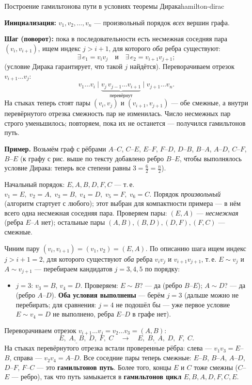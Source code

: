 \begin{algo}{Построение гамильтонова пути в условиях теоремы Дирака}{hamilton-dirac}

\textbf{Инициализация:} $v_1, v_2, \ldots, v_n$ --- произвольный порядок
\emph{всех} вершин графа.

\textbf{Шаг (поворот):} пока в последовательности есть несмежная соседняя
пара $(v_i, v_{i+1})$, ищем индекс $j > i + 1$, для которого
\emph{оба} ребра существуют:
\[
  \exists\, e_1 = v_i v_j \quad\text{и}\quad \exists\, e_2 = v_{i+1} v_{j+1};
\]
(условие Дирака гарантирует, что такой $j$ найдётся). Переворачиваем
отрезок $v_{i+1} \ldots v_j$:
\[
  v_1 \ldots v_i \;\bigl|\; \underbrace{v_j \, v_{j-1} \ldots v_{i+1}}_{\text{перевёрнут}} \;\bigl|\; v_{j+1} \ldots v_n.
\]
На стыках теперь стоят пары $(v_i, v_j)$ и $(v_{i+1}, v_{j+1})$ ---
обе смежные, а внутри перевёрнутого отрезка смежность пар не изменилась.
Число несмежных пар строго уменьшилось; повторяем, пока их не останется
--- получился гамильтонов путь.

\medskip
\noindent\textbf{Пример.} Возьмём граф с рёбрами
$A$--$C$, $C$--$E$, $E$--$F$, $F$--$D$, $D$--$B$, $B$--$A$, $A$--$D$,
$C$--$F$, $B$--$E$ (к графу с рис. выше по тексту добавлено ребро
$B$--$E$, чтобы выполнялось условие Дирака: теперь все степени равны
$3 = \frac{6}{2} = \frac{n}{2}$).


Начальный порядок: $E, A, B, D, F, C$ --- т.\,е.
$v_1 = E,\; v_2 = A,\; v_3 = B,\; v_4 = D,\; v_5 = F,\; v_6 = C$.
Порядок \emph{произвольный} (алгоритм стартует с любого); этот выбран
для компактности примера --- в нём всего одна несмежная соседняя пара.
Проверяем пары: $(E, A)$ --- \emph{несмежная} (ребра $E$--$A$ нет);
остальные пары $(A,B), (B,D), (D,F), (F,C)$ --- смежные.

Чиним пару $(v_i, v_{i+1}) = (v_1, v_2) = (E, A)$. По описанию шага ищем
индекс $j > i + 1 = 2$, для которого существуют \emph{оба} ребра
$v_i v_j$ и $v_{i+1} v_{j+1}$, т.\,е. $E \sim v_j$ и $A \sim v_{j+1}$
--- перебираем кандидатов $j = 3, 4, 5$ по порядку:
\begin{itemize}
  \item $j = 3$: $v_3 = B$, $v_4 = D$. Проверяем: $E \sim B$? --- да
        (ребро $B$--$E$); $A \sim D$? --- да (ребро $A$--$D$).
        \textbf{Оба условия выполнены} --- берём $j = 3$ (дальше можно
        не перебирать; для сравнения: $j = 4$ не подошёл бы --- уже
        первое условие $E \sim v_4 = D$ не выполнено, ребра $E$--$D$
        в графе нет).
\end{itemize}
Переворачиваем отрезок $v_{i+1} \ldots v_j = v_2 \ldots v_3 = (A, B)$:
\[
  E,\; \underline{A,\; B},\; D,\; F,\; C
  \quad\longrightarrow\quad
  E,\; \underline{B,\; A},\; D,\; F,\; C.
\]
На стыках перевёрнутого отрезка встали проверенные рёбра: слева ---
$v_1 v_3 = E$--$B$, справа --- $v_2 v_4 = A$--$D$.
Все соседние пары теперь смежные: $E$--$B$, $B$--$A$, $A$--$D$, $D$--$F$,
$F$--$C$ --- это \textbf{гамильтонов путь}. Более того, концы $E$ и $C$
тоже смежны ($C$--$E$ --- ребро), так что путь замыкается в
\textbf{гамильтонов цикл} $E, B, A, D, F, C, E$.


\end{algo}
